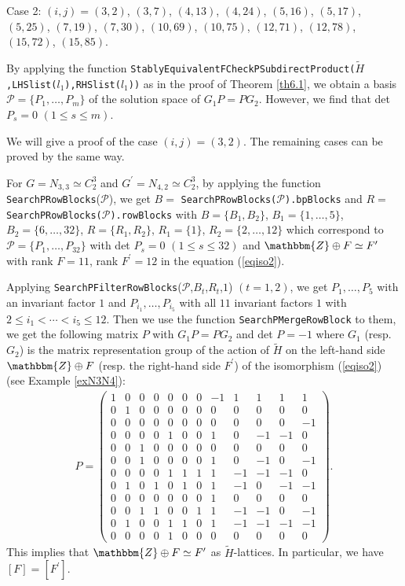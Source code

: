 \documentclass{amsart}
\theoremstyle{plain}
\theoremstyle{definition}
\theoremstyle{remark}
\newcommand{\bZ}{\mathbbm{Z}}\newcommand{\bQ}{\mathbbm{Q}}
\begin{document}
Case 2: $(i,j)=(3,2)$, $(3,7)$, $(4,13)$, $(4,24)$, 
$(5,16)$, $(5,17)$, $(5,25)$, $(7,19)$, $(7,30)$, $(10,69)$, 
$(10,75)$, $(12,71)$, $(12,78)$, $(15,72)$, $(15,85)$. 

By applying the function 
{\tt StablyEquivalentFCheckPSubdirectProduct($\widetilde{H}$,LHSlist($l_1$),RHSlist($l_1$))} as in the proof of Theorem \ref{th6.1}, 
we obtain a basis 
$\mathcal{P}=\{P_1,\dots,P_m\}$ of the solution space of $G_1P=PG_2$. 
However, we find that det $P_s=0$ $(1\leq s\leq m)$. 

We will give a proof of the case $(i,j)=(3,2)$. 
The remaining cases can be proved by the same way. 

For $G=N_{3,3}\simeq C_2^3$ and $G^\prime=N_{4,2}\simeq C_2^3$, 
by applying the function {\tt SearchPRowBlocks}($\mathcal{P}$), 
we get 
$B=$ {\tt SearchPRowBlocks($\mathcal{P}$).bpBlocks} 
and 
$R=$ {\tt SearchPRowBlocks($\mathcal{P}$).rowBlocks} 
with $B=\{B_1,B_2\}$, $B_1=\{1,\ldots,5\}$, $B_2=\{6,\ldots,32\}$, 
$R=\{R_1,R_2\}$, $R_1=\{1\}$, $R_2=\{2,\ldots,12\}$ 
which correspond to 
$\mathcal{P}=\{P_1,\ldots,P_{32}\}$ with 
det $P_s=0$ $(1\leq s\leq 32)$ 
and $\bZ\oplus F\simeq F^\prime$
with rank $F=11$, rank $F^\prime=12$ 
in the equation (\ref{eqiso2}). 

Applying 
{\tt SearchPFilterRowBlocks}($\mathcal{P}$,$B_t$,$R_t$,$1$) 
$(t=1,2)$, 
we get $P_1,\ldots,P_5$ with an invariant factor $1$ 
and $P_{i_1},\ldots,P_{i_5}$ with all $11$ invariant factors $1$ 
with $2\leq i_1<\cdots<i_5\leq 12$. 
Then we use the function {\tt SearchPMergeRowBlock} to them, 
we get the following matrix $P$ with $G_1P=PG_2$ and det $P=-1$ 
where $G_1$ (resp. $G_2$) 
is the matrix representation group of the action of 
$\widetilde{H}$ 
on the left-hand side $\bZ\oplus F$ 
(resp. the right-hand side $F^\prime$) of the isomorphism (\ref{eqiso2}) 
(see Example \ref{exN3N4}): 
\begin{align*}
P=\left(\begin{array}{cccccccccccc} 
1&0&0&0&0&0&0&-1&1&1&1&1\\
0&1&0&0&0&0&0&0&0&0&0&0\\
0&0&0&0&0&0&0&0&0&0&0&-1\\
0&0&0&0&1&0&0&1&0&-1&-1&0\\
0&0&1&0&0&0&0&0&0&0&0&0\\
0&0&1&0&0&0&0&1&0&-1&0&-1\\
0&0&0&0&1&1&1&1&-1&-1&-1&0\\
0&1&0&1&0&1&0&1&-1&0&-1&-1\\
0&0&0&0&0&0&0&1&0&0&0&0\\
0&0&1&1&0&0&1&1&-1&-1&0&-1\\
0&1&0&0&1&1&0&1&-1&-1&-1&-1\\
0&0&0&0&1&0&0&0&0&0&0&0
\end{array}\right). 
\end{align*}
This implies that $\bZ\oplus F\simeq F^\prime$ 
as $\widetilde{H}$-lattices. 
In particular, we have $[F]=[F^\prime]$.\\ 
\end{document}
